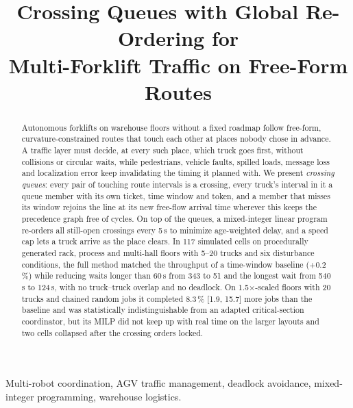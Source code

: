 \documentclass[conference]{IEEEtran}
\newcommand{\todo}[1]{\textcolor{red}{[TODO: #1]}}
\begin{document}
\title{Crossing Queues with Global Re-Ordering for\\
Multi-Forklift Traffic on Free-Form Routes}

\author{\IEEEauthorblockN{\todo{Author names}}
\IEEEauthorblockA{\todo{Affiliation}\\
\todo{e-mail}}}

\maketitle

\begin{abstract}
Autonomous forklifts on warehouse floors without a fixed roadmap follow
free-form, curvature-constrained routes that touch each other at places nobody
chose in advance. A traffic layer must decide, at every such place, which truck
goes first, without collisions or circular waits, while pedestrians, vehicle
faults, spilled loads, message loss and localization error keep invalidating
the timing it planned with. We present \emph{crossing queues}: every pair of
touching route intervals is a crossing, every truck's interval in it a queue
member with its own ticket, time window and token, and a member that misses
its window rejoins the line at its new free-flow arrival time wherever this
keeps the precedence graph free of cycles. On top of the queues, a
mixed-integer linear program re-orders all still-open crossings every 5\,s to
minimize age-weighted delay, and a speed cap lets a truck arrive as the place
clears. In 117 simulated cells on procedurally generated rack, process and
multi-hall floors with 5--20 trucks and six disturbance conditions, the full
method matched the throughput of a time-window baseline (+0.2\,\%) while
reducing waits longer than 60\,s from 343 to 51 and the longest wait from
540\,s to 124\,s, with no truck--truck overlap and no deadlock. On
1.5$\times$-scaled floors with 20 trucks and chained random jobs it completed
8.3\,\% [1.9, 15.7] more jobs than the baseline and was statistically
indistinguishable from an adapted critical-section coordinator, but its MILP
did not keep up with real time on the larger layouts and two cells collapsed
after the crossing orders locked.
\end{abstract}

\begin{IEEEkeywords}
Multi-robot coordination, AGV traffic management, deadlock avoidance,
mixed-integer programming, warehouse logistics.
\end{IEEEkeywords}
\end{document}
